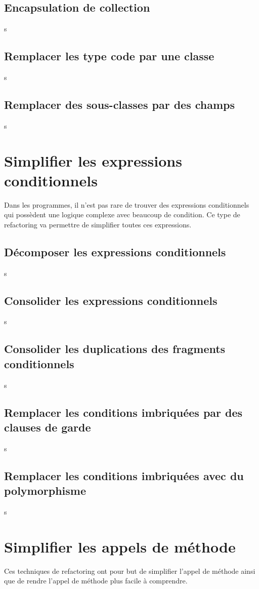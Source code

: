 \documentclass[a4paper,twoside,12pt,openright]{report}
\begin{document}
\subsection{Encapsulation de collection}
s
\subsection{Remplacer les type code par une classe}
s
\subsection{Remplacer des sous-classes par des champs}
s



\newpage
\section{Simplifier les expressions conditionnels}
Dans les programmes, il n'est pas rare de trouver des expressions conditionnels qui possèdent une logique complexe avec beaucoup de condition. Ce type de refactoring va permettre de simplifier toutes ces expressions.



\subsection{Décomposer les expressions conditionnels}
s
\subsection{Consolider les expressions conditionnels}
s
\subsection{Consolider les duplications des fragments conditionnels}
s
\subsection{Remplacer les conditions imbriquées par des clauses de garde}
s
\subsection{Remplacer les conditions imbriquées avec du polymorphisme}
s


\newpage
\section{Simplifier les appels de méthode}
Ces techniques de refactoring ont pour but de simplifier l'appel de méthode ainsi que de rendre l'appel de méthode plus facile à comprendre.
\end{document}
